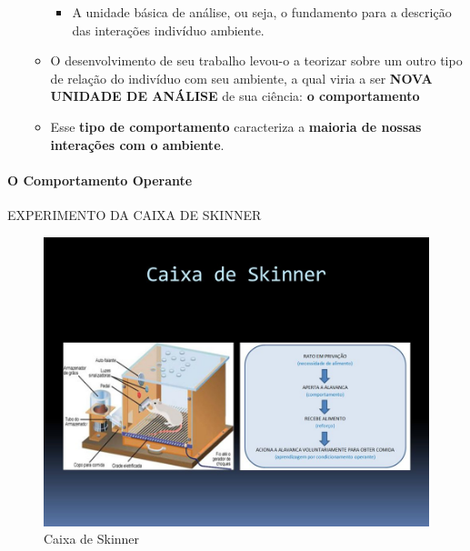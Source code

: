 \documentclass[
]{book}
\providecommand{\tightlist}{%
  \setlength{\itemsep}{0pt}\setlength{\parskip}{0pt}}
\begin{document}
\begin{itemize}
\begin{itemize}
    \begin{itemize}
    \tightlist
    \item
      A unidade básica de análise, ou seja, o fundamento para a descrição das interações indivíduo ambiente.
    \end{itemize}
  \item
    O desenvolvimento de seu trabalho levou-o a teorizar sobre um outro tipo de relação do indivíduo com seu ambiente, a qual viria a ser \textbf{NOVA UNIDADE DE ANÁLISE} de sua ciência: \textbf{o comportamento}
  \item
    Esse \textbf{tipo de comportamento} caracteriza a \textbf{maioria de nossas interações com o ambiente}.
  \end{itemize}
\end{itemize}

\hypertarget{o-comportamento-operante}{%
\paragraph{O Comportamento Operante}\label{o-comportamento-operante}}

EXPERIMENTO DA CAIXA DE SKINNER

\begin{figure}

{\centering \includegraphics[width=0.9\linewidth]{imagens/p1-caixa-de-skinner} 

}

\caption{Caixa de Skinner}\label{fig:unnamed-chunk-4}
\end{figure}
\end{document}
